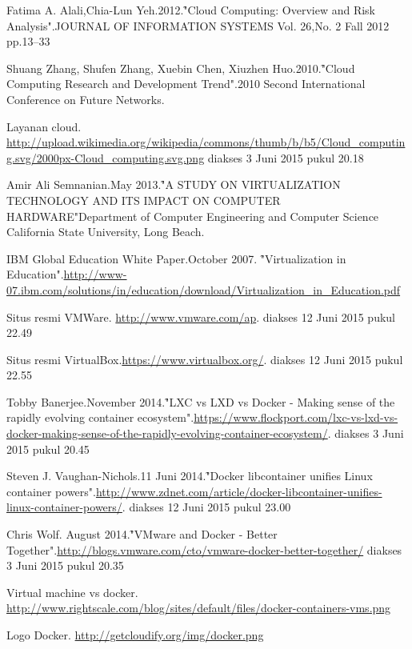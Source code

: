 \begin{thebibliography}{4}
{Fatima A. Alali,Chia-Lun Yeh.2012.\f{"Cloud Computing: Overview and Risk Analysis"}.JOURNAL OF INFORMATION SYSTEMS Vol. 26,No. 2 Fall 2012 pp.13–33}

{Shuang Zhang, Shufen Zhang, Xuebin Chen, Xiuzhen Huo.2010.\f{"Cloud Computing Research and Development Trend"}.2010 Second International Conference on Future Networks.}

{Layanan cloud. \url{http://upload.wikimedia.org/wikipedia/commons/thumb/b/b5/Cloud_computing.svg/2000px-Cloud_computing.svg.png} diakses 3 Juni 2015 pukul 20.18}

{Amir Ali Semnanian.May 2013.\f{"A STUDY ON VIRTUALIZATION TECHNOLOGY AND ITS IMPACT ON COMPUTER HARDWARE"}Department of Computer Engineering and Computer Science California State University, Long Beach.}

{IBM Global Education White Paper.October 2007. \f{"Virtualization in Education"}.\url{http://www-07.ibm.com/solutions/in/education/download/Virtualization_in_Education.pdf}}

{Situs resmi VMWare. \url{http://www.vmware.com/ap}. diakses 12 Juni 2015 pukul 22.49}

{Situs resmi VirtualBox.\url{https://www.virtualbox.org/}. diakses 12 Juni 2015 pukul 22.55}

{Tobby Banerjee.November 2014.\f{"LXC vs LXD vs Docker - Making sense of the rapidly evolving container ecosystem"}.\url{https://www.flockport.com/lxc-vs-lxd-vs-docker-making-sense-of-the-rapidly-evolving-container-ecosystem/}. diakses 3 Juni 2015 pukul 20.45}

{Steven J. Vaughan-Nichols.11 Juni 2014.\f{"Docker libcontainer unifies Linux container powers"}.\url{http://www.zdnet.com/article/docker-libcontainer-unifies-linux-container-powers/}. diakses 12 Juni 2015 pukul 23.00}

{Chris Wolf. August 2014.\f{"VMware and Docker - Better Together"}.\url{http://blogs.vmware.com/cto/vmware-docker-better-together/} diakses 3 Juni 2015 pukul 20.35}

{Virtual machine vs docker. \url{http://www.rightscale.com/blog/sites/default/files/docker-containers-vms.png} }

{Logo Docker. \url{http://getcloudify.org/img/docker.png}}


\end{thebibliography}
